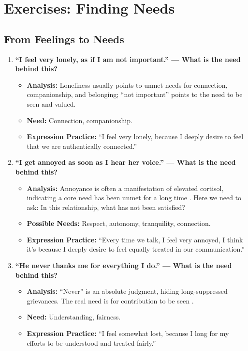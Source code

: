 \section{Exercises: Finding Needs}

\subsection{From Feelings to Needs}

\begin{enumerate}
    \item \textbf{``I feel very lonely, as if I am not important.'' --- What is the need behind this?}
    \begin{itemize}
        \item \textbf{Analysis:} Loneliness usually points to unmet needs
        for connection, companionship, and belonging; ``not important''
        points to the need to be seen and valued.
        \item \textbf{Need:} Connection, companionship.
        \item \textbf{Expression Practice:} ``I feel very lonely, because I
        deeply desire to feel that we are authentically connected.''
    \end{itemize}

    \item \textbf{``I get annoyed as soon as I hear her voice.'' --- What is the need behind this?}
    \begin{itemize}
        \item \textbf{Analysis:} Annoyance is often a manifestation of
        elevated cortisol, indicating a core need has been unmet for a long
        time \citep{howard2024}. Here we need to ask: In this relationship,
        what has not been satisfied?
        \item \textbf{Possible Needs:} Respect, autonomy, tranquility,
        connection.
        \item \textbf{Expression Practice:} ``Every time we talk, I feel
        very annoyed, I think it's because I deeply desire to feel equally
        treated in our communication.''
    \end{itemize}

    \item \textbf{``He never thanks me for everything I do.'' --- What is the need behind this?}
    \begin{itemize}
        \item \textbf{Analysis:} ``Never'' is an absolute judgment, hiding
        long-suppressed grievances. The real need is for contribution to
        be seen \citep{izard2001}.
        \item \textbf{Need:} Understanding, fairness.
        \item \textbf{Expression Practice:} ``I feel somewhat lost, because
        I long for my efforts to be understood and treated fairly.''
    \end{itemize}


\end{enumerate}
